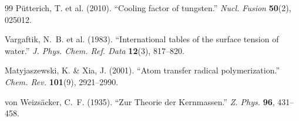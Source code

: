 \begin{thebibliography}{99}
P\"utterich, T. et al. (2010).
``Cooling factor of tungsten.''
\textit{Nucl. Fusion} \textbf{50}(2), 025012.

Vargaftik, N.~B. et al. (1983).
``International tables of the surface tension of water.''
\textit{J. Phys. Chem. Ref. Data} \textbf{12}(3), 817--820.

Matyjaszewski, K. \& Xia, J. (2001).
``Atom transfer radical polymerization.''
\textit{Chem. Rev.} \textbf{101}(9), 2921--2990.

von Weizs\"acker, C.~F. (1935).
``Zur Theorie der Kernmassen.''
\textit{Z. Phys.} \textbf{96}, 431--458.

\end{thebibliography}
